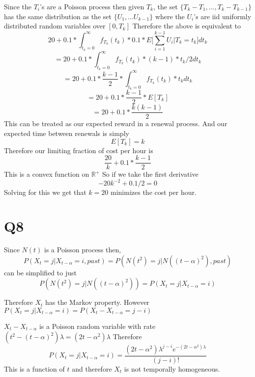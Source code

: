 \documentclass{article}
\begin{document}
Since the $T_i$'s are a Poisson process then given $T_k$, the set
$\{T_k - T_1,..., T_k - T_{k-1}\}$ has the same distribution as the set $\{U_1, ... U_{k-1}\}$ where the $U_i$'s are iid uniformly distributed random variables over $[0,T_k]$
Therefore the above is equivalent to 
$$
20 + 0.1 * \int_{t_k = 0} ^ \infty f_{T_k}(t_k) * 0.1*E\bigg[ \sum_{i = 1}^{k-1} U_i \bigg| T_k = t_k\bigg] dt_k
$$
$$
= 20 + 0.1 * \int_{t_k = 0} ^ \infty f_{T_k}(t_k) * (k-1) * t_k/2 dt_k
$$
$$
= 20 + 0.1 * \frac{k-1}{2}*\int_{t_k = 0} ^ \infty f_{T_k}(t_k) * t_k dt_k
$$
$$
= 20 + 0.1* \frac{k-1}{2}*E[T_k]
$$
$$
= 20 + 0.1 * \frac{k(k-1)}{2}
$$
This can be treated as our expected reward in a renewal process. And our expected time between renewals is simply
$$
E[T_k] = k
$$
Therefore our limiting fraction of cost per hour is
$$
\frac{20}{k} + 0.1*\frac{k-1}{2}
$$
This is a convex function on $\mathbb{R}^+$
So if we take the first derivative
$$
-20k^{-2} + 0.1/2 = 0
$$
Solving for this we get that $k = 20$ minimizes the cost per hour. 

\section*{Q8}
Since $N(t)$ is a Poisson process then,
$$
P(X_t = j | X_{t-\alpha} = i, past) = P(N(t^2) = j | N((t-\alpha)^2), past)
$$
can be simplified to just
$$
P(N(t^2) = j | N((t-\alpha)^2)) = P(X_t = j | X_{t-\alpha} = i)
$$

Therefore $X_t$ has the Markov property.
However
$
P(X_t = j | X_{t-\alpha} = i) = P(X_t - X_{t-\alpha} = j-i)
$

$X_t - X_{t-\alpha}$ is a Poisson random variable with rate $(t^2 - (t-\alpha)^2)\lambda = (2t-\alpha^2)\lambda$
Therefore 
$$
P(X_t = j | X_{t-\alpha} = i) = \frac{(2t-\alpha^2)\lambda^{j-i}e^{-(2t-\alpha^2)\lambda}}{(j-i)!}
$$
This is a function of $t$ and therefore $X_t$ is not temporally homogeneous.
\end{document}
